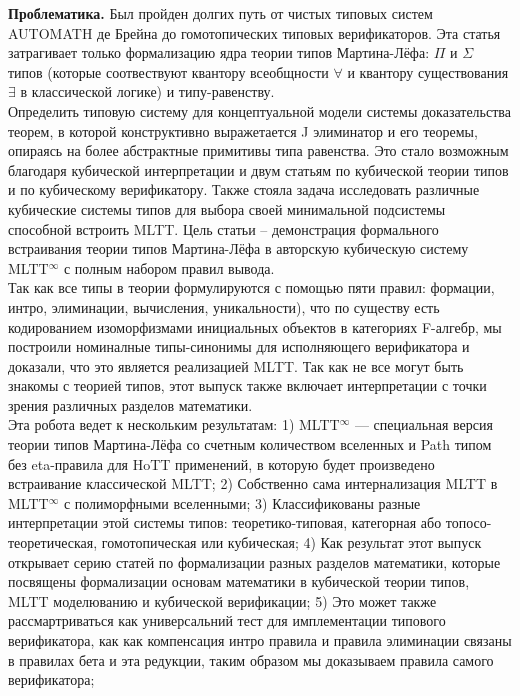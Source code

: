 \documentclass[twocolumn,10pt]{article}
\theoremstyle{definition}
\begin{document}
\begin{@twocolumnfalse}
{\bf Проблематика.}
Был пройден долгих путь от чистых типовых систем AUTOMATH де Брейна до
гомотопических типовых верификаторов. Эта статья затрагивает только формализацию
ядра теории типов Мартина-Лёфа: $\Pi$ и $\Sigma$ типов (которые соотвествуют
квантору всеобщности $\forall$ и квантору существования $\exists$ в классической логике)
и типу-равенству.\\
Определить типовую систему для концептуальной модели системы доказательства теорем,
в которой конструктивно выражетается J элиминатор и его теоремы, опираясь на более абстрактные
примитивы типа равенства. Это стало возможным благодаря кубической интерпретации и двум
статьям по кубической теории типов и по кубическому верификатору. Также стояла задача
исследовать различные кубические системы типов для выбора своей минимальной подсистемы способной встроить MLTT.
Цель статьи -- демонстрация формального встраивания теории типов Мартина-Лёфа в авторскую кубическую
систему MLTT$^{\infty}$ с полным набором правил вывода.\\
Так как все типы в теории формулируются с помощью пяти
правил: формации, интро, элиминации, вычисления, уникальности), что по существу
есть кодированием изоморфизмами инициальных объектов в категориях F-алгебр, мы построили
номиналные типы-синонимы для исполняющего верификатора и доказали, что это является реализацией MLTT.
Так как не все могут быть знакомы с теорией типов, этот выпуск также включает интерпретации с точки
зрения различных разделов математики.\\
Эта робота ведет к нескольким результатам:
1) MLTT$^{\infty}$ --- специальная версия теории типов Мартина-Лёфа со счетным количеством вселенных
   и Path типом без eta-правила для HoTT применений, в которую будет произведено встраивание классической MLTT;
2) Собственно сама интернализация MLTT в MLTT$^{\infty}$ с полиморфными вселенными;
3) Классификованы разные интерпретации этой системы типов: теоретико-типовая, категорная або топосо-теоретическая, гомотопическая или кубическая;
4) Как результат этот выпуск открывает серию статей по формализации разных разделов математики,
   которые посвящены формализации основам математики в кубической теории типов, MLTT моделюванию и кубической верификации;
5) Это может также рассмартриваться как универсальний тест для имплементации типового верификатора,
как как компенсация интро правила и правила элиминации связаны в правилах бета и эта редукции, таким образом
мы доказываем правила самого верификатора;

\end{@twocolumnfalse}
\end{document}
